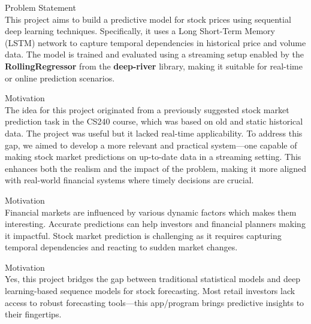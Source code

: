 \documentclass[9pt]{beamer}
\begin{document}
\begin{frame}{Problem Statement}
    \\[0.2cm]
    This project aims to build a predictive model for stock prices using
    sequential deep learning techniques. Specifically, it uses a Long
    Short-Term
    Memory (LSTM) network to capture temporal dependencies in historical price
    and
    volume data. The model is trained and evaluated using a streaming setup
    enabled
    by the \textbf{RollingRegressor} from the \textbf{deep-river} library,
    making
    it suitable for real-time or online prediction scenarios.

\end{frame}

\begin{frame}{Motivation}
    \\[0.3cm]

    The idea for this project originated from a previously suggested stock
    market prediction task in the CS240 course, which was based on old and
    static
    historical data. The project was useful but it lacked real-time
    applicability.
    To address this gap, we aimed to develop a more relevant and practical
    system—one capable of making stock market predictions on up-to-date data in
    a
    streaming setting. This enhances both the realism and the impact of the
    problem, making it more aligned with real-world financial systems where
    timely
    decisions are crucial.
\end{frame}

\begin{frame}{Motivation}
    \\[0.3cm]

    Financial markets are influenced by various dynamic factors which makes
    them interesting.  Accurate predictions can help investors and financial
    planners making it impactful. Stock market prediction is challenging as it
    requires capturing temporal dependencies and reacting to sudden market changes.

\end{frame}

\begin{frame}{Motivation}
    \\[0.3cm]

    Yes, this project bridges the gap between traditional statistical models
    and deep learning-based sequence models for stock forecasting. Most retail
    investors lack access to robust forecasting tools—this app/program brings
    predictive insights to their fingertips.

\end{frame}
\end{document}
